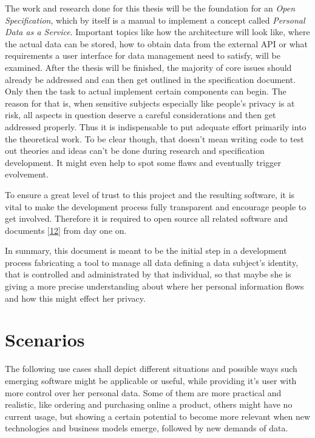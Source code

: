 \documentclass[12pt,english,a4paper,titlepage,cleardoublepage=empty,dottedtoc]{report}
\begin{document}
The work and research done for this thesis will be the foundation for an
\emph{Open Specification}, which by itself is a manual to implement a
concept called \emph{Personal Data as a Service}. Important topics like
how the architecture will look like, where the actual data can be
stored, how to obtain data from the external API or what requirements a
user interface for data management need to satisfy, will be examined.
After the thesis will be finished, the majority of core issues should
already be addressed and can then get outlined in the specification
document. Only then the task to actual implement certain components can
begin. The reason for that is, when sensitive subjects especially like
people's privacy is at risk, all aspects in question deserve a careful
considerations and then get addressed properly. Thus it is indispensable
to put adequate effort primarily into the theoretical work. To be clear
though, that doesn't mean writing code to test out theories and ideas
can't be done during research and specification development. It might
even help to spot some flaws and eventually trigger evolvement.

To ensure a great level of trust to this project and the resulting
software, it is vital to make the development process fully transparent
and encourage people to get involved. Therefore it is required to open
source all related software and documents
{[}\protect\hyperlink{ref-repo_2016_pdaas-spec}{12}{]} from day one on.

In summary, this document is meant to be the initial step in a
development process fabricating a tool to manage all data defining a
data subject's identity, that is controlled and administrated by that
individual, so that maybe she is giving a more precise understanding
about where her personal information flows and how this might effect her
privacy.

\section{Scenarios}\label{scenarios}

The following use cases shall depict different situations and possible
ways such emerging software might be applicable or useful, while
providing it's user with more control over her personal data. Some of
them are more practical and realistic, like ordering and purchasing
online a product, others might have no current usage, but showing a
certain potential to become more relevant when new technologies and
business models emerge, followed by new demands of data.
\end{document}
